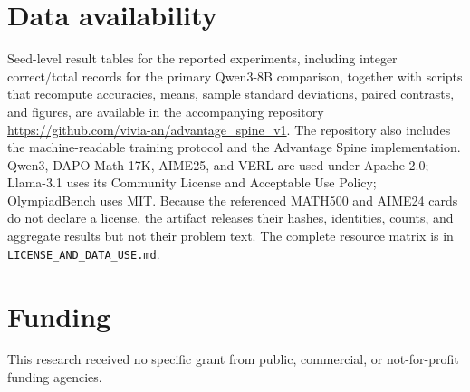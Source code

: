 \documentclass[5p,times]{elsarticle}
\begin{document}
\section*{Data availability}
Seed-level result tables for the reported experiments, including integer
correct/total records for the primary Qwen3-8B comparison, together with
scripts that recompute accuracies, means, sample standard deviations, paired
contrasts, and figures, are available in the accompanying repository
\url{https://github.com/vivia-an/advantage_spine_v1}. The repository also
includes the machine-readable training protocol and the Advantage Spine
implementation. Qwen3, DAPO-Math-17K, AIME25, and VERL are used under
Apache-2.0; Llama-3.1 uses its Community License and Acceptable Use Policy;
OlympiadBench uses MIT. Because the referenced MATH500 and AIME24 cards do not
declare a license, the artifact releases their hashes, identities, counts, and
aggregate results but not their problem text. The complete resource matrix is
in \texttt{LICENSE\_AND\_DATA\_USE.md}.

\section*{Funding}
This research received no specific grant from public, commercial, or
not-for-profit funding agencies.

\renewcommand{\bibfont}{\scriptsize}
\setlength{\bibsep}{0pt plus 0.2ex}


\end{document}
